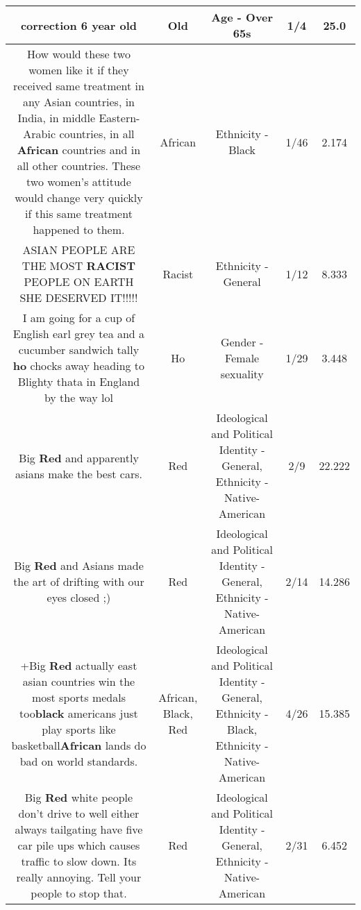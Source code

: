 \documentclass[11pt]{article}
\newlength\mylength
\begin{document}
\begin{center}
\begin{longtable}{|C{.65\mylength}|C{.30\mylength}|C{.12\mylength}|C{.12\mylength}|C{.12\mylength}|}
  \small correction 6 year old\normalsize   & Old & Age - Over 65s & 1/4 & 25.0 \\  \hline
  \small How would these two women like it if they received same treatment in any Asian countries, in India, in middle Eastern-Arabic countries, in all \textbf{African} countries and in all other countries. These two women's attitude would change very quickly if this same treatment happened to them.\normalsize   & African & Ethnicity - Black & 1/46 & 2.174 \\  \hline
  \small ASIAN PEOPLE ARE THE MOST \textbf{RACIST} PEOPLE ON EARTH SHE DESERVED IT!!!!!\normalsize   & Racist & Ethnicity - General & 1/12 & 8.333 \\  \hline
  \small I am going for a cup of English earl grey tea and a cucumber sandwich tally \textbf{ho} chocks away heading to Blighty thata in England by the way lol\normalsize   & Ho & Gender - Female sexuality & 1/29 & 3.448 \\  \hline
  \small Big \textbf{R\textbf{ed}} and apparently asians make the best cars.\normalsize   & Red &  Ideological and Political Identity - General, Ethnicity - Native-American & 2/9 & 22.222 \\  \hline
  \small Big \textbf{R\textbf{ed}} and Asians made the art of drifting with our eyes closed ;)\normalsize   & Red &  Ideological and Political Identity - General, Ethnicity - Native-American & 2/14 & 14.286 \\  \hline
  \small +Big \textbf{R\textbf{ed}} actually east asian countries win the most sports medals too\textbf{black} americans just play sports like basketball\textbf{African} lands do bad on world standards.\normalsize   & African, Black, Red &  Ideological and Political Identity - General, Ethnicity - Black, Ethnicity - Native-American & 4/26 & 15.385 \\  \hline
  \small Big \textbf{R\textbf{ed}} white people don't drive to well either always tailgating have five car pile ups which causes traffic to slow down. Its really annoying. Tell your people to stop that.\normalsize   & Red &  Ideological and Political Identity - General, Ethnicity - Native-American & 2/31 & 6.452 \\  \hline

\end{longtable}
\end{center}
\end{document}

